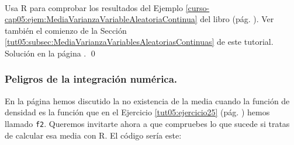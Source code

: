 \documentclass[10pt,a4paper]{article}\usepackage[]{graphicx}\usepackage[]{color}
\begin{document}
\begin{ejercicio}
\label{tut05:ejercicio28}
\quad\\
Usa R para comprobar los resultados del Ejemplo \ref{curso-cap05:ejem:MediaVarianzaVariableAleatoriaContinua} del libro (pág. \pageref{curso-cap05:ejem:MediaVarianzaVariableAleatoriaContinua}). Ver también el comienzo de la Sección \ref{tut05:subsec:MediaVarianzaVariablesAleatoriasContinuas} de este tutorial. Solución en la página \pageref{tut05:ejercicio28:sol}.
\qed
\end{ejercicio}

\subsubsection{Peligros de la integración numérica.}
\label{tut05:subsubsec:PeligrosIntegracionNumerica}

En la página \pageref{tut05:parag:IntegralMediaCauchyNoConverge} hemos discutido la no existencia de la media cuando la función de  densidad es la función que en el Ejercicio \ref{tut05:ejercicio25} (pág. \pageref{tut05:ejercicio25}) hemos llamado {\tt f2}. Queremos invitarte ahora a que compruebes lo que sucede si tratas de calcular esa media con R. El código sería este:
\end{document}
